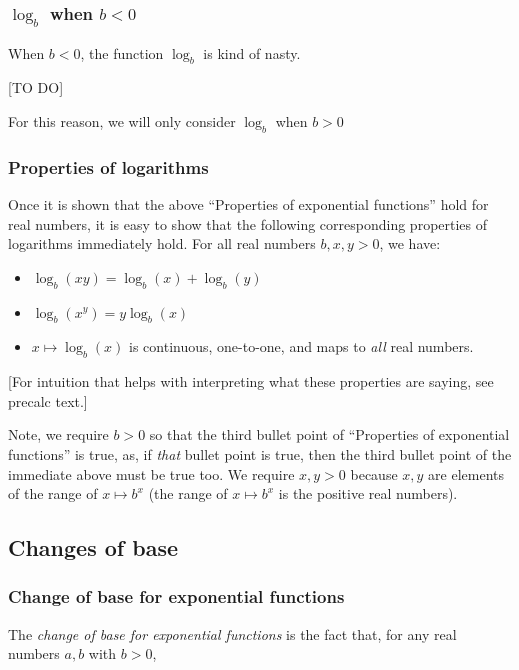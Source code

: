 \documentclass{article}
\begin{document}
\subsubsection*{$\log_b$ when $b < 0$}

When $b < 0$, the function $\log_b$ is kind of nasty.

[TO DO]

For this reason, we will only consider $\log_b$ when $b > 0$

\subsubsection*{Properties of logarithms}

Once it is shown that the above ``Properties of exponential functions'' hold for real numbers, it is easy to show that the following corresponding properties of logarithms immediately hold. For all real numbers $b, x, y > 0$, we have:

\begin{itemize}
    \item $\log_b(xy) = \log_b(x) + \log_b(y)$
    \item $\log_b(x^y) = y\log_b(x)$
    \item $x \mapsto \log_b(x)$ is continuous, one-to-one, and maps to \textit{all} real numbers.
\end{itemize}

[For intuition that helps with interpreting what these properties are saying, see precalc text.]

Note, we require $b > 0$ so that the third bullet point of ``Properties of exponential functions'' is true, as, if \textit{that} bullet point is true, then the third bullet point of the immediate above must be true too. We require $x, y > 0$ because $x, y$ are elements of the range of $x \mapsto b^x$ (the range of $x \mapsto b^x$ is the positive real numbers).

\subsection*{Changes of base}

\subsubsection*{Change of base for exponential functions}

The \textit{change of base for exponential functions} is the fact that, for any real numbers $a, b$ with $b > 0$,
\end{document}
